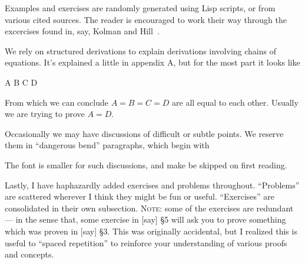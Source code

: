Examples and exercises are randomly generated using Lisp scripts, or
from various cited sources. The reader is encouraged to work their way
through the excercises found in, say, Kolman and Hill~\cite{kolman}.

We rely on structured derivations to explain derivations involving
chains of equations. It's explained a little in appendix A, but for the
most part it looks like
\begin{calculation}
  A
  B
  C
  D
\end{calculation}
From which we can conclude $A=B=C=D$ are all equal to each
other. Usually we are trying to prove $A=D$.

Occasionally we may have discussions of difficult or subtle points. We
reserve them in ``dangerous bend'' paragraphs, which begin with
\begin{center}
  \dbend\smallbreak
\end{center}
The font is smaller for such discussions, and make be skipped on first
reading.

Lastly, I have haphazardly added exercises and problems
throughout. ``Problems'' are scattered wherever I think they might be
fun or useful. ``Exercises'' are consolidated in their own subsection.
\textsc{Note:} some of the exercises are redundant --- in the sense
that, some exercise in [say] \S5 will ask you to prove something which was
proven in [say] \S3. This was originally accidental, but I realized this
is useful to ``spaced repetition'' to reinforce your understanding of
various proofs and concepts.